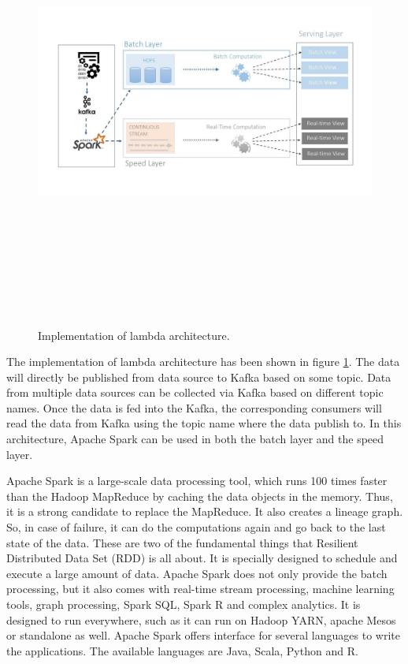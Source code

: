 \begin{figure}[htpb]
	\centering
	\includegraphics[width=17cm,height=15cm,keepaspectratio=true]{images/imp_lambda_arc}
	\caption{
		Implementation of lambda architecture.
	}
	\label{fig:impl_lambda_arc}
\end{figure}


The implementation of lambda architecture has been shown in figure \ref{fig:impl_lambda_arc}. The data will directly be published from data source to Kafka based on some topic. Data from multiple data sources can be collected via Kafka based on different topic names. Once the data is fed into the Kafka, the corresponding consumers will read the data from Kafka using the topic name where the data publish to. In this architecture, Apache Spark can be used in both the batch layer and the speed layer. 

Apache Spark is a large-scale data processing tool, which runs 100 times faster than the Hadoop MapReduce by caching the data objects in the memory. Thus, it is a strong candidate to replace the MapReduce. It also creates a lineage graph. So, in case of failure, it can do the computations again and go back to the last state of the data. These are two of the fundamental things that Resilient Distributed Data Set (RDD) is all about. It is specially designed to schedule and execute a large amount of data. Apache Spark does not only provide the batch processing, but it also comes with real-time stream processing, machine learning tools, graph processing, Spark SQL, Spark R and complex analytics. It is designed to run everywhere, such as it can run on Hadoop YARN, apache Mesos or standalone as well. Apache Spark offers interface for several languages to write the applications. The available languages are Java, Scala, Python and R.


